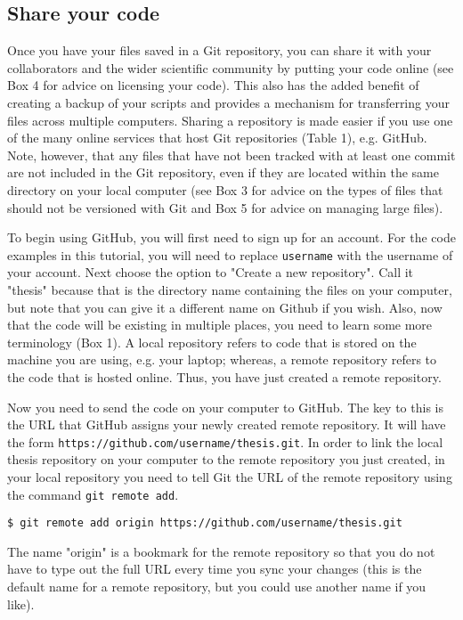 \subsection{Share your code}

Once you have your files saved in a Git repository, you can share it with your collaborators and the wider scientific community by putting your code online (see Box 4 for advice on licensing your code).
This also has the added benefit of creating a backup of your scripts and provides a mechanism for transferring your files across multiple computers.
Sharing a repository is made easier if you use one of the many online services that host Git repositories (Table 1), e.g. GitHub.
Note, however, that any files that have not been tracked with at least one commit are not included in the Git repository, even if they are located within the same directory on your local computer (see Box 3 for advice on the types of files that should not be versioned with Git and Box 5 for advice on managing large files).

To begin using GitHub, you will first need to sign up for an account.
For the code examples in this tutorial, you will need to replace \verb|username| with the username of your account.
Next choose the option to "Create a new repository".
Call it "thesis" because that is the directory name containing the files on your computer, but note that you can give it a different name on Github if you wish.
Also, now that the code will be existing in multiple places, you need to learn some more terminology (Box 1).
A local repository refers to code that is stored on the machine you are using, e.g. your laptop; whereas, a remote repository refers to the code that is hosted online.
Thus, you have just created a remote repository.

Now you need to send the code on your computer to GitHub.
The key to this is the URL that GitHub assigns your newly created remote repository.
It will have the form \verb|https://github.com/username/thesis.git|.
In order to link the local thesis repository on your computer to the remote repository you just created, in your local repository you need to tell Git the URL of the remote repository using the command \verb|git remote add|.

\begin{lstlisting}
$ git remote add origin https://github.com/username/thesis.git
\end{lstlisting}

The name "origin" is a bookmark for the remote repository so that you do not have to type out the full URL every time you sync your changes (this is the default name for a remote repository, but you could use another name if you like).

